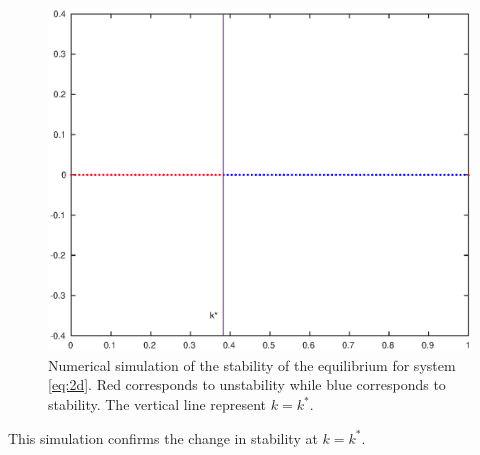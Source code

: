 \documentclass{article}
\begin{document}
\begin{figure}[H]
\centering
\includegraphics[scale=0.5]{bifur.eps}
\caption{Numerical simulation of the stability of the equilibrium for system \ref{eq:2d}. Red corresponds to unstability while blue corresponds to stability. The vertical line represent $k=k^{\ast}$.}
\label{fig:bifur}
\end{figure}

This simulation confirms the change in stability at $k=k^{\ast}$.
\end{document}

